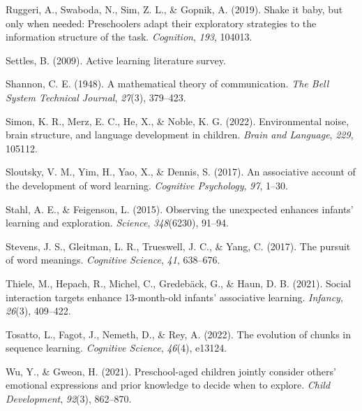 \documentclass[10pt, letterpaper]{article}
\newenvironment{CSLReferences}%
  {}%
  {\par}
\begin{document}
\begin{CSLReferences}{1}{0}
\leavevmode{}%
Ruggeri, A., Swaboda, N., Sim, Z. L., \& Gopnik, A. (2019). Shake it
baby, but only when needed: Preschoolers adapt their exploratory
strategies to the information structure of the task. \emph{Cognition},
\emph{193}, 104013.

\leavevmode{}%
Settles, B. (2009). Active learning literature survey.

\leavevmode{}%
Shannon, C. E. (1948). A mathematical theory of communication. \emph{The
Bell System Technical Journal}, \emph{27}(3), 379--423.

\leavevmode{}%
Simon, K. R., Merz, E. C., He, X., \& Noble, K. G. (2022). Environmental
noise, brain structure, and language development in children.
\emph{Brain and Language}, \emph{229}, 105112.

\leavevmode{}%
Sloutsky, V. M., Yim, H., Yao, X., \& Dennis, S. (2017). An associative
account of the development of word learning. \emph{Cognitive
Psychology}, \emph{97}, 1--30.

\leavevmode{}%
Stahl, A. E., \& Feigenson, L. (2015). Observing the unexpected enhances
infants' learning and exploration. \emph{Science}, \emph{348}(6230),
91--94.

\leavevmode{}%
Stevens, J. S., Gleitman, L. R., Trueswell, J. C., \& Yang, C. (2017).
The pursuit of word meanings. \emph{Cognitive Science}, \emph{41},
638--676.

\leavevmode{}%
Thiele, M., Hepach, R., Michel, C., Gredebäck, G., \& Haun, D. B.
(2021). Social interaction targets enhance 13-month-old infants'
associative learning. \emph{Infancy}, \emph{26}(3), 409--422.

\leavevmode{}%
Tosatto, L., Fagot, J., Nemeth, D., \& Rey, A. (2022). The evolution of
chunks in sequence learning. \emph{Cognitive Science}, \emph{46}(4),
e13124.

\leavevmode{}%
Wu, Y., \& Gweon, H. (2021). Preschool-aged children jointly consider
others' emotional expressions and prior knowledge to decide when to
explore. \emph{Child Development}, \emph{92}(3), 862--870.

\end{CSLReferences}


\end{document}
